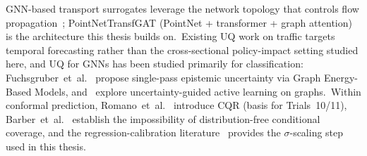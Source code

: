 GNN-based transport surrogates leverage the network topology that controls flow propagation~\cite{natterer2025ml}; PointNetTransfGAT (PointNet + transformer + graph attention)~\cite{natterer2025ml} is the architecture this thesis builds on.\ Existing UQ work on traffic targets temporal forecasting rather than the cross-sectional policy-impact setting studied here, and UQ for GNNs has been studied primarily for classification: Fuchsgruber~et~al.~\cite{fuchsgruber2024energy} propose single-pass epistemic uncertainty via Graph Energy-Based Models, and~\cite{fuchsgruber2024uncertainty} explore uncertainty-guided active learning on graphs.\ Within conformal prediction, Romano~et~al.~\cite{romano2019conformalized} introduce CQR (basis for Trials~10/11), Barber~et~al.~\cite{barber2021limits} establish the impossibility of distribution-free conditional coverage, and the regression-calibration literature~\cite{kuleshov2018accurate,laves2020wellcal,guo2017calibration} provides the $\sigma$-scaling step used in this thesis.
